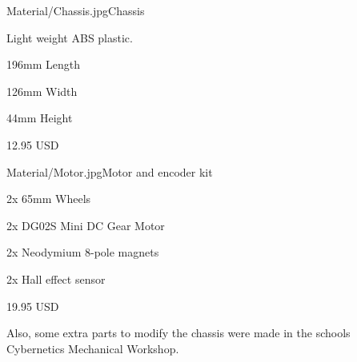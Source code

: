 \begin{material}{Material/Chassis.jpg}{Chassis}
\item Light weight ABS plastic.
\item 196mm Length 
\item 126mm Width 
\item 44mm Height
\item 12.95 USD
\end{material}

\begin{material}{Material/Motor.jpg}{Motor and encoder kit}
\item 2x 65mm Wheels
\item 2x DG02S Mini DC Gear Motor
\item 2x Neodymium 8-pole magnets
\item 2x Hall effect sensor
\item 19.95 USD
\end{material}

Also, some extra parts to modify the chassis were made in the schools Cybernetics Mechanical Workshop.